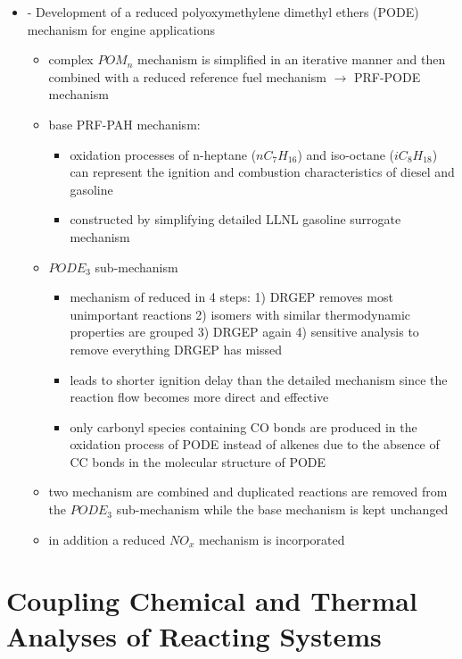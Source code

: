 \documentclass[12pt,oneside,a4paper,english]{article}
\begin{document}
\begin{itemize}
\item{\cite{Ren2019} - Development of a reduced polyoxymethylene dimethyl ethers (PODE) mechanism for engine applications}

	\begin{itemize}
	\item{complex $POM_n$ mechanism is simplified in an iterative manner and then combined with a reduced reference fuel mechanism $\rightarrow$ PRF-PODE mechanism}
	\item{base PRF-PAH mechanism:}
	
		\begin{itemize}
		\item{oxidation processes of n-heptane ($nC_7H_{16}$) and iso-octane ($iC_8H_{18}$) can represent the ignition and combustion characteristics of diesel and gasoline}
		\item{constructed by simplifying detailed LLNL gasoline surrogate mechanism}
		\end{itemize}
		
	\item{$PODE_3$ sub-mechanism}
	
		\begin{itemize}
		\item{mechanism of \cite{He2018} reduced in 4 steps: 1) DRGEP removes most unimportant reactions 2) isomers with similar thermodynamic properties are grouped 3) DRGEP again 4) sensitive analysis to remove everything DRGEP has missed}
		\item{leads to shorter ignition delay than the detailed mechanism since the reaction flow becomes more direct and effective}
		\item{ only carbonyl species containing CO bonds are produced in the oxidation process of PODE instead of alkenes due to the absence of CC bonds in the molecular structure of PODE}
		\end{itemize}
	
	\item{two mechanism are combined and duplicated reactions are removed from the $PODE_3$ sub-mechanism while the base mechanism is kept unchanged}
	\item{in addition a reduced $NO_x$ mechanism is incorporated}
	\end{itemize}

\end{itemize}
\newpage %

\section{Coupling Chemical and Thermal Analyses of Reacting Systems}
\end{document}
